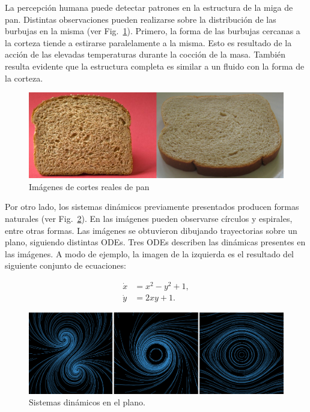 \documentclass[oneside,a4paper,spanish,links]{amca}
\begin{document}
La percepci\'on humana puede detectar patrones en la estructura de la miga de pan. Distintas observaciones pueden realizarse sobre la distribuci\'on de las burbujas en la misma (ver Fig.~\ref{fg:fig2}). Primero, la forma de las burbujas cercanas a la corteza tiende a estirarse paralelamente a la misma. Esto es resultado de la acci\'on de las elevadas temperaturas durante la cocci\'on de la masa. Tambi\'en resulta evidente que la estructura completa es similar a un fluido con la forma de la corteza.


\begin{figure}[htb!]
  \centerline{\includegraphics[scale=0.45]{fig2}}
  \caption{Im\'agenes de cortes reales de pan}
  \label{fg:fig2}
\end{figure}

Por otro lado, los sistemas din\'amicos previamente presentados producen formas naturales (ver Fig.~\ref{fg:fig3}). En las im\'agenes pueden observarse c\'irculos y espirales, entre otras formas. Las im\'agenes se obtuvieron dibujando trayectorias sobre un plano, siguiendo distintas ODEs. Tres ODEs describen las din\'amicas presentes en las im\'agenes. A modo de ejemplo, la imagen de la izquierda es el resultado del siguiente conjunto de ecuaciones:

\begin{equation} \label{eq:simple}  
  \begin{aligned}
    \dot{x} &= x^{2}-y^{2}+1,\\
    \dot{y} &= 2xy+1.
  \end{aligned}
\end{equation}


\begin{figure}[htb!]
  \centerline{\includegraphics[scale=0.28]{fig3}}
  \caption{Sistemas din\'amicos en el plano.}
  \label{fg:fig3}
\end{figure}
\end{document}
